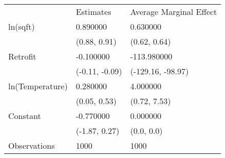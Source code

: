 \begin{tabular}{lll}
 & Estimates & Average Marginal Effect \\
ln(sqft) & 0.890000 & 0.630000 \\
  & (0.88, 0.91) & (0.62, 0.64) \\
Retrofit & -0.100000 & -113.980000 \\
  & (-0.11, -0.09) & (-129.16, -98.97) \\
ln(Temperature) & 0.280000 & 4.000000 \\
  & (0.05, 0.53) & (0.72, 7.53) \\
Constant & -0.770000 & 0.000000 \\
  & (-1.87, 0.27) & (0.0, 0.0) \\
Observations & 1000 & 1000 \\
\end{tabular}

